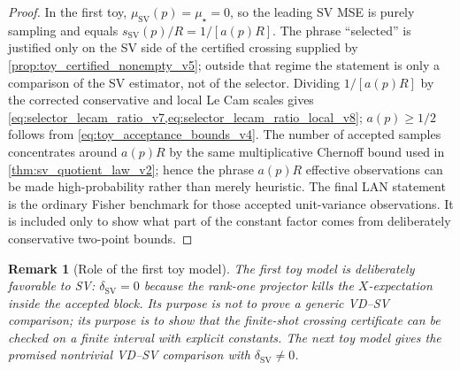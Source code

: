 \documentclass[11pt]{article}
\newtheorem{remark}{Remark}
\newcommand{\1}{\mathbf{1}}
\begin{document}
\begin{proof}
In the first toy, \(\mu_{\mathrm{SV}}(p)=\mu_\star=0\), so the leading SV MSE is purely sampling and equals \(s_{\mathrm{SV}}(p)/R=1/[a(p)R]\).  The phrase ``selected'' is justified only on the SV side of the certified crossing supplied by \cref{prop:toy_certified_nonempty_v5}; outside that regime the statement is only a comparison of the SV estimator, not of the selector.  Dividing \(1/[a(p)R]\) by the corrected conservative and local Le Cam scales gives \cref{eq:selector_lecam_ratio_v7,eq:selector_lecam_ratio_local_v8}; \(a(p)\ge1/2\) follows from \cref{eq:toy_acceptance_bounds_v4}.  The number of accepted samples concentrates around \(a(p)R\) by the same multiplicative Chernoff bound used in \cref{thm:sv_quotient_law_v2}; hence the phrase \(a(p)R\) effective observations can be made high-probability rather than merely heuristic.  The final LAN statement is the ordinary Fisher benchmark for those accepted unit-variance observations.  It is included only to show what part of the constant factor comes from deliberately conservative two-point bounds.
\end{proof}

\begin{remark}[Role of the first toy model]
The first toy model is deliberately favorable to SV: \(\delta_{\mathrm{SV}}=0\) because the rank-one projector kills the \(X\)-expectation inside the accepted block.  Its purpose is not to prove a generic VD--SV comparison; its purpose is to show that the finite-shot crossing certificate can be checked on a finite interval with explicit constants.  The next toy model gives the promised nontrivial VD--SV comparison with \(\delta_{\mathrm{SV}}\ne0\).
\end{remark}
\end{document}
